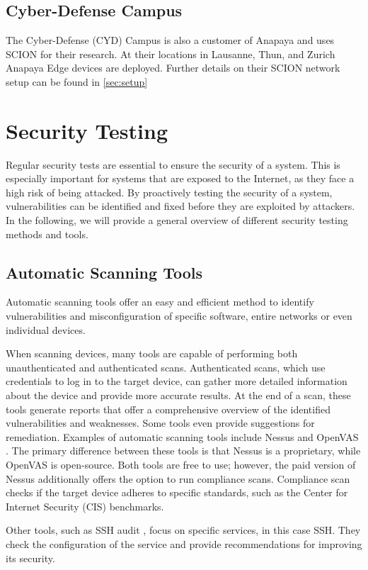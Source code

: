 \subsection{Cyber-Defense Campus}
The Cyber-Defense (CYD) Campus is also a customer of Anapaya and uses SCION for their research.
At their locations in Lausanne, Thun, and Zurich Anapaya Edge devices are deployed.
Further details on their SCION network setup can be found in \cref{sec:setup}



\section{Security Testing}
\label{sec:security_testing}
Regular security tests are essential to ensure the security of a system.
This is especially important for systems that are exposed to the Internet, as they face a high risk of being attacked.
By proactively testing the security of a system, vulnerabilities can be identified and fixed before they are exploited by attackers.
In the following, we will provide a general overview of different security testing methods and tools.

\subsection{Automatic Scanning Tools}
Automatic scanning tools offer an easy and efficient method to identify vulnerabilities and misconfiguration of specific software, entire networks or even individual devices.

When scanning devices, many tools are capable of performing both unauthenticated and authenticated scans.
Authenticated scans, which use credentials to log in to the target device, can gather more detailed information about the device and provide more accurate results.
At the end of a scan, these tools generate reports that offer a comprehensive overview of the identified vulnerabilities and weaknesses.
Some tools even provide suggestions for remediation.
Examples of automatic scanning tools include Nessus \cite{nessus} and OpenVAS \cite{openvas}.
The primary difference between these tools is that Nessus is a proprietary, while OpenVAS is open-source.
Both tools are free to use; however, the paid version of Nessus additionally offers the option to run compliance scans.
Compliance scan checks if the target device adheres to specific standards, such as the Center for Internet Security (CIS) benchmarks.

Other tools, such as SSH audit \cite{sshaudit}, focus on specific services, in this case SSH.
They check the configuration of the service and provide recommendations for improving its security.


